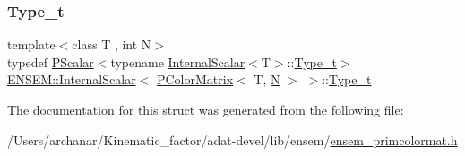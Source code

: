 \mbox{\label{structENSEM_1_1InternalScalar_3_01PColorMatrix_3_01T_00_01N_01_4_01_4_a9b1738a10ca607ed8d2cee3b7e88d1b1}} 
\subsubsection{\texorpdfstring{Type\_t}{Type\_t}\hspace{0.1cm}{\footnotesize\ttfamily [3/3]}}
{\footnotesize\ttfamily template$<$class T , int N$>$ \\
typedef \mbox{\hyperlink{classENSEM_1_1PScalar}{P\+Scalar}}$<$typename \mbox{\hyperlink{structENSEM_1_1InternalScalar}{Internal\+Scalar}}$<$T$>$\+::\mbox{\hyperlink{structENSEM_1_1InternalScalar_3_01PColorMatrix_3_01T_00_01N_01_4_01_4_a9b1738a10ca607ed8d2cee3b7e88d1b1}{Type\+\_\+t}}$>$ \mbox{\hyperlink{structENSEM_1_1InternalScalar}{E\+N\+S\+E\+M\+::\+Internal\+Scalar}}$<$ \mbox{\hyperlink{classENSEM_1_1PColorMatrix}{P\+Color\+Matrix}}$<$ T, \mbox{\hyperlink{adat__devel_2lib_2hadron_2operator__name__util_8cc_a7722c8ecbb62d99aee7ce68b1752f337}{N}} $>$ $>$\+::\mbox{\hyperlink{structENSEM_1_1InternalScalar_3_01PColorMatrix_3_01T_00_01N_01_4_01_4_a9b1738a10ca607ed8d2cee3b7e88d1b1}{Type\+\_\+t}}}



The documentation for this struct was generated from the following file\+:\begin{DoxyCompactItemize}
\item 
/\+Users/archanar/\+Kinematic\+\_\+factor/adat-\/devel/lib/ensem/\mbox{\hyperlink{adat-devel_2lib_2ensem_2ensem__primcolormat_8h}{ensem\+\_\+primcolormat.\+h}}\end{DoxyCompactItemize}
